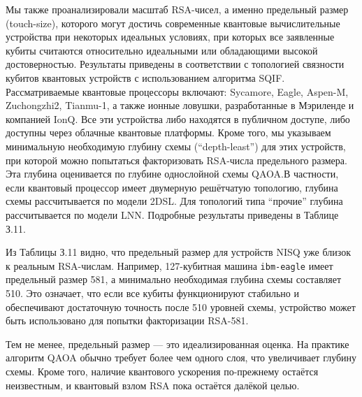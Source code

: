 Мы также проанализировали масштаб RSA-чисел, а именно предельный размер
(touch-size), которого могут достичь современные квантовые вычислительные
устройства при некоторых идеальных условиях, при которых все заявленные кубиты
считаются относительно идеальными или обладающими высокой достоверностью.
Результаты приведены в соответствии с топологией связности кубитов квантовых
устройств с использованием алгоритма SQIF. Рассматриваемые квантовые процессоры
включают: Sycamore, Eagle, Aspen-M, Zuchongzhi2, Tianmu-1, а также ионные
ловушки, разработанные в Мэриленде и компанией IonQ. Все эти устройства либо
находятся в публичном доступе, либо доступны через облачные квантовые
платформы. Кроме того, мы указываем минимальную необходимую глубину схемы
(``depth-least'') для этих устройств, при которой можно попытаться
факторизовать RSA-числа предельного размера. Эта глубина оценивается по глубине
однослойной схемы QAOA.В частности, если квантовый процессор имеет двумерную
решётчатую топологию, глубина схемы рассчитывается по модели 2DSL. Для
топологий типа ``прочие'' глубина рассчитывается по модели LNN. Подробные
результаты приведены в Таблице З.11.

Из Таблицы З.11 видно, что предельный размер для устройств NISQ уже близок к
реальным RSA-числам. Например, 127-кубитная машина \texttt{ibm-eagle} имеет
предельный размер 581, а минимально необходимая глубина схемы составляет 510.
Это означает, что если все кубиты функционируют стабильно и обеспечивают
достаточную точность после 510 уровней схемы, устройство может быть
использовано для попытки факторизации RSA-581.

Тем не менее, предельный размер — это идеализированная оценка. На практике
алгоритм QAOA обычно требует более чем одного слоя, что увеличивает глубину
схемы. Кроме того, наличие квантового ускорения по-прежнему остаётся
неизвестным, и квантовый взлом RSA пока остаётся далёкой целью.

